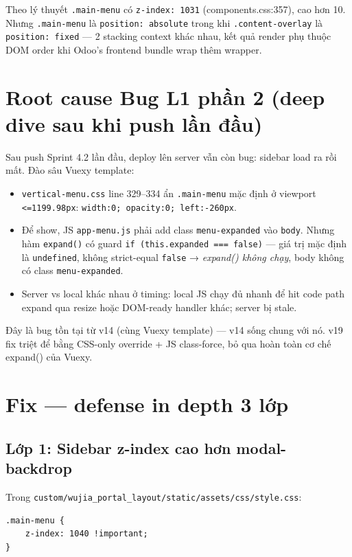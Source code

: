 Theo lý thuyết \texttt{.main-menu} có \texttt{z-index: 1031} (components.css:357), cao hơn 10. Nhưng \texttt{.main-menu} là \texttt{position: absolute} trong khi \texttt{.content-overlay} là \texttt{position: fixed} --- 2 stacking context khác nhau, kết quả render phụ thuộc DOM order khi Odoo's frontend bundle wrap thêm wrapper.

\section{Root cause Bug L1 phần 2 (deep dive sau khi push lần đầu)}

Sau push Sprint 4.2 lần đầu, deploy lên server vẫn còn bug: sidebar load ra rồi mất. Đào sâu Vuexy template:

\begin{itemize}
    \item \texttt{vertical-menu.css} line 329--334 ẩn \texttt{.main-menu} mặc định ở viewport \texttt{<=1199.98px}: \texttt{width:0; opacity:0; left:-260px}.
    \item Để show, JS \texttt{app-menu.js} phải add class \texttt{menu-expanded} vào \texttt{body}. Nhưng hàm \texttt{expand()} có guard \texttt{if (this.expanded === false)} --- giá trị mặc định là \texttt{undefined}, không strict-equal \texttt{false} → \emph{expand() không chạy}, body không có class \texttt{menu-expanded}.
    \item Server vs local khác nhau ở timing: local JS chạy đủ nhanh để hit code path expand qua resize hoặc DOM-ready handler khác; server bị stale.
\end{itemize}

Đây là bug tồn tại từ v14 (cùng Vuexy template) --- v14 sống chung với nó. v19 fix triệt để bằng CSS-only override + JS class-force, bỏ qua hoàn toàn cơ chế expand() của Vuexy.

\section{Fix --- defense in depth 3 lớp}

\subsection{Lớp 1: Sidebar z-index cao hơn modal-backdrop}

Trong \texttt{custom/wujia\_portal\_layout/static/assets/css/style.css}:

\begin{lstlisting}[style=python]
.main-menu {
    z-index: 1040 !important;
}
\end{lstlisting}

